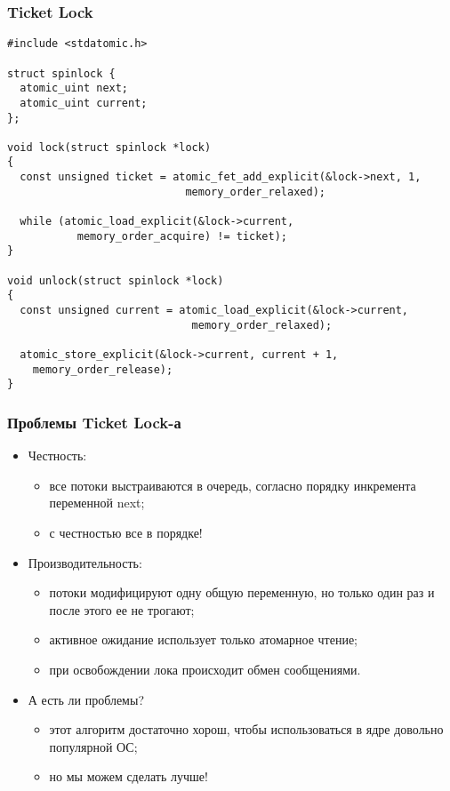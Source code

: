 \begin{frame}[fragile]
\frametitle{Ticket Lock}
\begin{lstlisting}
#include <stdatomic.h>

struct spinlock {
  atomic_uint next;
  atomic_uint current;
};

void lock(struct spinlock *lock)
{
  const unsigned ticket = atomic_fet_add_explicit(&lock->next, 1,
                            memory_order_relaxed);

  while (atomic_load_explicit(&lock->current,
           memory_order_acquire) != ticket);
}

void unlock(struct spinlock *lock)
{
  const unsigned current = atomic_load_explicit(&lock->current,
                             memory_order_relaxed);

  atomic_store_explicit(&lock->current, current + 1,
    memory_order_release);
}
\end{lstlisting}
\end{frame}

\begin{frame}
\frametitle{Проблемы Ticket Lock-а}
\begin{itemize}
  \item Честность:
  \begin{itemize}
    \item все потоки выстраиваются в очередь, согласно порядку инкремента
    переменной next;
    \item с честностью все в порядке!
  \end{itemize}
  \item Производительность:
  \begin{itemize}
    \item потоки модифицируют одну общую переменную, но только один раз и после
    этого ее не трогают;
    \item активное ожидание использует только атомарное чтение;
    \item при освобождении лока происходит обмен сообщениями.
  \end{itemize}
  \item А есть ли проблемы?
  \begin{itemize}
    \item этот алгоритм достаточно хорош, чтобы использоваться в ядре довольно
    популярной ОС;
    \item но мы можем сделать лучше!
  \end{itemize}
\end{itemize}
\end{frame}

